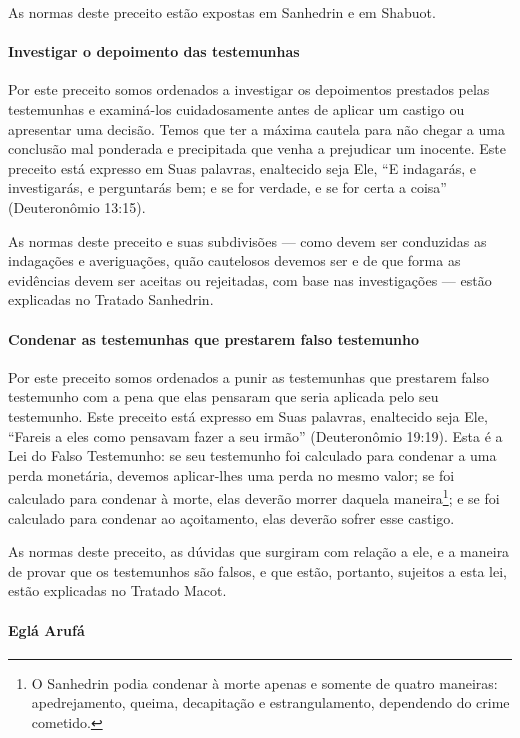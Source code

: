 As normas deste preceito estão expostas em Sanhedrin e em Shabuot.

\paragraph{Investigar o depoimento das testemunhas}

Por este preceito somos ordenados a investigar os depoimentos prestados
pelas testemunhas e examiná-los cuidadosamente antes de aplicar um
castigo ou apresentar uma decisão. Temos que ter a máxima cautela para
não chegar a uma conclusão mal ponderada e precipitada que venha a
prejudicar um inocente. Este preceito está expresso em Suas palavras,
enaltecido seja Ele, ``E indagarás, e investigarás, e perguntarás bem; e
se for verdade, e se for certa a coisa'' (Deuteronômio 13:15).

As normas deste preceito e suas subdivisões --- como devem ser
conduzidas as indagações e averiguações, quão cautelosos devemos ser e
de que forma as evidências devem ser aceitas ou rejeitadas, com base nas
investigações --- estão explicadas no Tratado Sanhedrin.

\paragraph{Condenar as testemunhas que prestarem falso testemunho}

Por este preceito somos ordenados a punir as testemunhas que prestarem
falso testemunho com a pena que elas pensaram que seria aplicada pelo
seu testemunho. Este preceito está expresso em Suas palavras, enaltecido
seja Ele, ``Fareis a eles como pensavam fazer a seu irmão''
(Deuteronômio 19:19). Esta é a Lei do Falso Testemunho: se seu
testemunho foi calculado para condenar a uma perda monetária, devemos aplicar-lhes uma perda no mesmo valor;
se foi calculado para condenar à morte, elas deverão morrer daquela
maneira\footnote{O Sanhedrin podia condenar à morte apenas e somente de quatro
maneiras: apedrejamento, queima, decapitação e estrangulamento,
dependendo do crime cometido.};
e se foi calculado para condenar ao açoitamento, elas deverão sofrer
esse castigo.

As normas deste preceito, as dúvidas que surgiram com relação a ele, e a
maneira de provar que os testemunhos são falsos, e que estão, portanto,
sujeitos a esta lei, estão explicadas no Tratado Macot.


\paragraph{Eglá Arufá}

